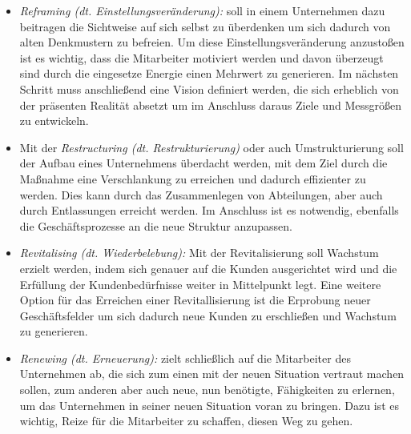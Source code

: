 \begin{itemize}
    \item[] \emph{Reframing (dt. Einstellungsveränderung):} soll in einem Unternehmen dazu beitragen die Sichtweise auf sich selbst zu überdenken um sich dadurch von alten Denkmustern zu befreien. Um diese Einstellungsveränderung anzustoßen ist es wichtig, dass die Mitarbeiter motiviert werden und davon überzeugt sind durch die eingesetze Energie einen Mehrwert zu generieren. Im nächsten Schritt muss anschließend eine Vision definiert werden, die sich erheblich von der präsenten Realität absetzt um im Anschluss daraus Ziele und Messgrößen zu entwickeln. 
    \item[] Mit der \emph{Restructuring (dt. Restrukturierung)} oder auch Umstrukturierung soll der Aufbau eines Unternehmens überdacht werden, mit dem Ziel durch die Maßnahme eine Verschlankung zu erreichen und dadurch effizienter zu werden. Dies kann durch das Zusammenlegen von Abteilungen, aber auch durch Entlassungen erreicht werden. Im Anschluss ist es notwendig, ebenfalls die Geschäftsprozesse an die neue Struktur anzupassen.   
    \item[] \emph{Revitalising (dt. Wiederbelebung):} Mit der Revitalisierung soll Wachstum erzielt werden, indem sich genauer auf die Kunden ausgerichtet wird und die Erfüllung der Kundenbedürfnisse weiter in Mittelpunkt legt. Eine weitere Option für das Erreichen einer Revitallisierung ist die Erprobung neuer Geschäftsfelder um sich dadurch neue Kunden zu erschließen und Wachstum zu generieren.
    \item[] \emph{Renewing (dt. Erneuerung):} zielt schließlich auf die Mitarbeiter des Unternehmen ab, die sich zum einen mit der neuen Situation vertraut machen sollen, zum anderen aber auch neue, nun benötigte, Fähigkeiten zu erlernen, um das Unternehmen in seiner neuen Situation voran zu bringen. Dazu ist es wichtig, Reize für die Mitarbeiter zu schaffen, diesen Weg zu gehen.
\end{itemize}

